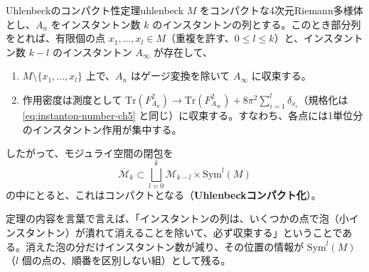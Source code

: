 \documentclass[uplatex, dvipdfmx, book]{jsbook}
\begin{document}
\begin{mythm}{Uhlenbeckのコンパクト性定理}{uhlenbeck}
$M$ をコンパクトな4次元Riemann多様体とし、$A_n$ をインスタントン数 $k$ のインスタントンの列とする。このとき部分列をとれば、有限個の点 $x_1, \dots, x_l \in M$（重複を許す、$0 \le l \le k$）と、インスタントン数 $k - l$ のインスタントン $A_\infty$ が存在して、
\begin{enumerate}
    \item $M \setminus \{x_1, \dots, x_l\}$ 上で、$A_n$ はゲージ変換を除いて $A_\infty$ に収束する。
    \item 作用密度は測度として $\mathrm{Tr}(F_{A_n}^2) \to \mathrm{Tr}(F_{A_\infty}^2) + 8\pi^2 \sum_{i=1}^{l} \delta_{x_i}$（規格化は \eqref{eq:instanton-number-ch5} と同じ）に収束する。すなわち、各点には1単位分のインスタントン作用が集中する。
\end{enumerate}
したがって、モジュライ空間の閉包を
\begin{equation*}
    \overline{\mathcal{M}}_k \subset \bigsqcup_{l=0}^{k} \mathcal{M}_{k-l} \times \mathrm{Sym}^l(M)
\end{equation*}
の中にとると、これはコンパクトとなる（\textbf{Uhlenbeckコンパクト化}）。
\end{mythm}

定理の内容を言葉で言えば、「インスタントンの列は、いくつかの点で泡（小インスタントン）が潰れて消えることを除いて、必ず収束する」ということである。消えた泡の分だけインスタントン数が減り、その位置の情報が $\mathrm{Sym}^l(M)$（$l$ 個の点の、順番を区別しない組）として残る。
\end{document}
